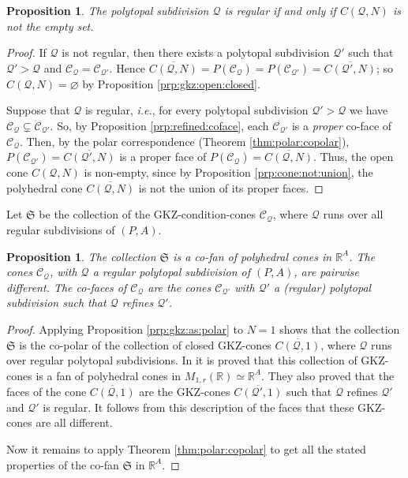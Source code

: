 \documentclass[12pt, a4article]{amsart}   	%
\numberwithin{equation}{section}
\theoremstyle{plain}
\newtheorem{proposition}[theorem]{Proposition}
\theoremstyle{definition}
\newcommand{\R}{{\mathbb R}}
\newcommand{\mcC}{{\mathcal C}}
\newcommand{\mcQ}{{\mathcal Q}}
\newcommand{\mfS}{{\mathfrak S}}
\begin{document}
\begin{proposition}\label{psp:regular}
The polytopal subdivision $\mcQ$ is regular if and only if $C(\mcQ,N)$ is not the empty set.
\end{proposition}

\begin{proof}
If $\mcQ$ is not regular, then there exists a polytopal subdivision $\mcQ'$ such that $\mcQ'>\mcQ$ and $\mcC_\mcQ = \mcC_{\mcQ'}$. Hence $\overline{C(\mcQ,N)} = P(\mcC_\mcQ) = P(\mcC_{\mcQ'}) = \overline{C(\mcQ',N)}$; so $C(\mcQ,N) = \varnothing$ by Proposition \ref{prp:gkz:open:closed}.

Suppose that $\mcQ$ is regular, \emph{i.e.}, for every polytopal subdivision $\mcQ'>\mcQ$ we have $\mcC_\mcQ \subsetneq \mcC_{\mcQ'}$. So, by Proposition \ref{prp:refined:coface}, each $\mcC_{\mcQ'}$ is a \emph{proper} co-face of $\mcC_\mcQ$. Then, by the polar correspondence (Theorem \ref{thm:polar:copolar}), $P(\mcC_{\mcQ'}) = \overline{C(\mcQ',N)}$ is a proper face of $P(\mcC_\mcQ) = \overline{C(\mcQ,N)}$. Thus, the open cone $C(\mcQ,N)$ is non-empty, since by Proposition \ref{prp:cone:not:union}, the polyhedral cone $\overline{C(\mcQ,N)}$ is not the union of  its proper faces.
\end{proof}

Let $\mfS$ be the collection of the GKZ-condition-cones $\mcC_\mcQ$, where $\mcQ$ runs over all regular subdivisions of $(P,A)$.

\begin{proposition}\label{prp:condition:cofan}
The collection $\mfS$ is a co-fan of polyhedral cones in $\R^A$. The cones $\mcC_\mcQ$, with $\mcQ$ a regular polytopal subdivision of $(P,A)$, are pairwise different. The co-faces of $\mcC_\mcQ$ are the cones $\mcC_{\mcQ'}$ with $\mcQ'$ a (regular) polytopal subdivision such that $\mcQ$ refines $\mcQ'$.
\end{proposition}

\begin{proof}
Applying Proposition \ref{prp:gkz:as:polar} to $N=1$ shows that the collection $\mfS$ is the co-polar of the collection of closed GKZ-cones $\overline{C(\mcQ,1)}$, where $\mcQ$ runs over regular polytopal subdivisions. In \cite[Chapter 7, Proposition 1.5]{GKZ} it is proved that this collection of GKZ-cones is a fan of polyhedral cones in $M_{1,r}(\R)\simeq\R^A$. They also proved that the faces of the cone $\overline{C(\mcQ,1)}$ are the GKZ-cones $\overline{C(\mcQ',1)}$ such that $\mcQ$ refines $\mcQ'$ and $\mcQ'$ is regular. It follows from this description of the faces that these GKZ-cones are all different.

Now it remains to apply Theorem \ref{thm:polar:copolar} to get all the stated properties of the co-fan $\mfS$ in $\R^A$.
\end{proof}
\end{document}
